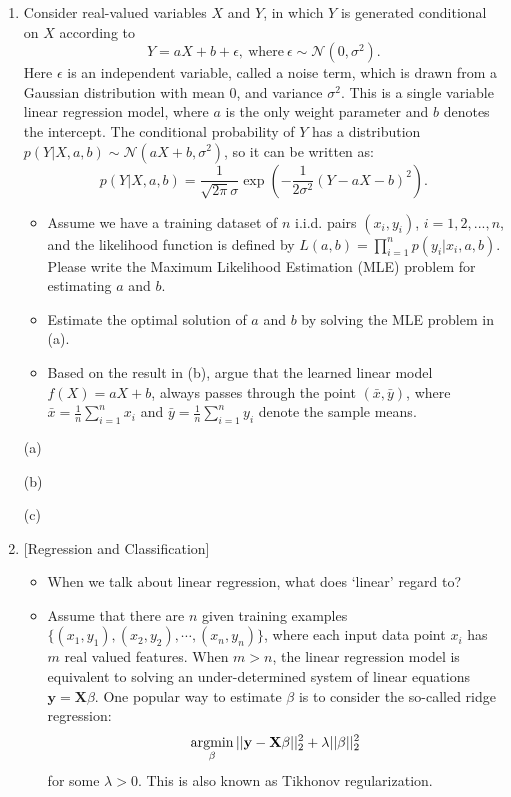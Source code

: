 \documentclass[10pt]{article}
\begin{document}
\begin{enumerate}[1.]
	\item {} Consider real-valued variables $X$ and $Y$, in which $Y$ is generated conditional on $X$ according to
	$$
	Y = aX + b + \epsilon, \ \text{where} \ \epsilon \sim \mathcal{N}(0, \sigma^2).
	$$
	Here $\epsilon$ is an independent variable, called a noise term, which is drawn from a Gaussian distribution with mean 0,
	and variance $\sigma^2$. This is a single variable linear regression model, where $a$ is the only weight parameter and $b$ denotes the intercept.
	The conditional probability of $Y$ has a distribution $p(Y | X, a, b) \sim \mathcal{N}(aX+b, \sigma^2)$, so it can be written as:
	$$
	p(Y|X, a,b) = \frac{1}{\sqrt{2\pi}\sigma}\exp\left(-\frac{1}{2\sigma^2}(Y - aX -b)^2\right).
	$$
	\begin{itemize}
		\item[(a)] Assume we have a training dataset of $n$ i.i.d. pairs $(x_i, y_i)$, $i = 1, 2, ..., n$, and
		the likelihood function is defined by $L(a,b) = \prod_{i=1}^n p(y_i | x_i, a, b)$. Please write the
		Maximum Likelihood Estimation (MLE) problem for estimating $a$ and $b$.~
		\item[(b)] Estimate the optimal solution of $a$ and $b$ by solving the MLE problem in (a).~
		\item[(c)] Based on the result in (b), argue that the learned linear model $f(X) = aX + b$,
		always passes through the point $(\bar{x},\bar{y})$,
		where $\bar{x} = \tfrac{1}{n}\sum_{i=1}^{n}x_{i}$ and $\bar{y} = \tfrac{1}{n}\sum_{i=1}^{n}y_{i}$ denote the sample means.~
	\end{itemize}
(a)



(b)




(c)







	      \newpage

	\item {} [Regression and Classification]
	      \begin{itemize}
			\item[(a)] When we talk about linear regression, what does `linear' regard to? 
			\item[(b)] Assume that there are $n$ given training examples $\{(x_1, y_1), (x_2, y_2), \cdots, (x_n, y_n)\}$,
			where each input data point $x_i$ has $m$ real valued features. When $m > n$, the linear regression model
			is equivalent to solving an under-determined system of linear equations $\mathbf{y} = \mathbf{X}\beta$. One popular way to
			estimate $\beta$ is to consider the so-called ridge regression:
			\[\mathop{\rm argmin}_{\beta} ||\mathbf{y}-\mathbf{X}\mathbf{\beta}||_2^2 + \lambda||\beta||_2^2\]
			for some $\lambda > 0$. This is also known as Tikhonov regularization.
			

\end{itemize}
\end{enumerate}
\end{document}
